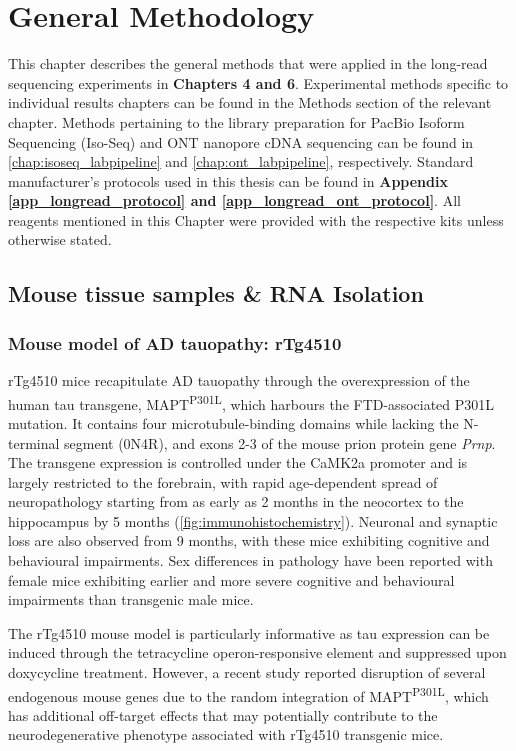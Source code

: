 \chapter{General Methodology}\label{ch: general methodology}

This chapter describes the general methods that were applied in the long-read sequencing experiments in \textbf{Chapters 4 and 6}. Experimental methods specific to individual results chapters can be found in the Methods section of the relevant chapter. Methods pertaining to the library preparation for PacBio Isoform Sequencing (Iso-Seq) and ONT nanopore cDNA sequencing can be found in \cref{chap:isoseq_labpipeline} and \cref{chap:ont_labpipeline}, respectively. Standard manufacturer's protocols used in this thesis can be found in \textbf{Appendix \ref{app_longread_protocol} and \ref{app_longread_ont_protocol}}. All reagents mentioned in this Chapter were provided with the respective kits unless otherwise stated.

\section{Mouse tissue samples \& RNA Isolation}

\subsection{Mouse model of AD tauopathy: rTg4510} 
\label{ch2: rtg4510}
rTg4510 mice recapitulate AD tauopathy through the overexpression of the human tau transgene, MAPT\textsuperscript{P301L}, which harbours the FTD-associated P301L mutation. It contains four microtubule-binding domains while lacking the N-terminal segment (0N4R), and exons 2-3 of the mouse prion protein gene \textit{Prnp}. The transgene expression is controlled under the CaMK2a promoter and is largely restricted to the forebrain, with rapid age-dependent spread of neuropathology starting from as early as 2 months in the neocortex to the hippocampus by 5 months (\cref{fig:immunohistochemistry}). Neuronal and synaptic loss are also observed from 9 months, with these mice exhibiting cognitive and behavioural impairments. Sex differences in pathology have been reported with female mice exhibiting earlier and more severe cognitive and behavioural impairments than transgenic male mice\cite{M2011}. 

The rTg4510 mouse model is particularly informative as tau expression can be induced through the tetracycline operon-responsive element and suppressed upon doxycycline treatment\cite{Ramsden2005}. However, a recent study reported disruption of several endogenous mouse genes due to the random integration of MAPT\textsuperscript{P301L}, which has additional off-target effects that may potentially contribute to the neurodegenerative phenotype associated with rTg4510 transgenic mice\cite{Gamache2019}. 
 

